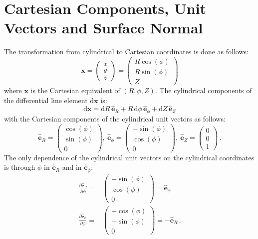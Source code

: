 \section{Cartesian Components, Unit Vectors and Surface Normal}
The transformation from cylindrical to Cartesian coordinates is done as follows:
\begin{equation}
  \mathbf{x}
  = \left( \begin{array}{c} x \\ y \\ z \end{array} \right)
  = \left( \begin{array}{c}
                        R \cos(\phi) \\
                        R \sin(\phi) \\
                        Z
                      \end{array} \right) \label{eqn:cyl2cart}
\end{equation}
where $\mathbf{x}$ is the Cartesian equivalent of $(R, \phi, Z)$.
The cylindrical components of the differential line element $\mathrm{d}\mathbf{x}$ is:
\begin{equation}
  \mathrm{d}\mathbf{x} = \mathrm{d}R \, \hat{\mathbf{e}}_R + R \, \mathrm{d}\phi \, \hat{\mathbf{e}}_\phi + \mathrm{d}Z \, \hat{\mathbf{e}}_Z \label{eqn:dx_cyl}
\end{equation}
with the Cartesian components of the cylindrical unit vectors as follows:
\begin{equation}
  \hat{\mathbf{e}}_R    = \left( \begin{array}{c}  \cos(\phi) \\ \sin(\phi) \\ 0 \end{array} \right), ~
  \hat{\mathbf{e}}_\phi = \left( \begin{array}{c} -\sin(\phi) \\ \cos(\phi) \\ 0 \end{array} \right), ~
  \hat{\mathbf{e}}_Z    = \left( \begin{array}{c}      0      \\     0      \\ 1 \end{array} \right) \, .
\end{equation}
The only dependence of the cylindrical unit vectors on the cylindrical coordinates
is through $\phi$ in $\hat{\mathbf{e}}_R$ and in $\hat{\mathbf{e}}_\phi$:
\begin{align}
  \frac{\partial \hat{\mathbf{e}}_R   }{\partial \phi} =& \left( \begin{array}{c} -\sin(\phi) \\  \cos(\phi) \\ 0 \end{array} \right) =  \hat{\mathbf{e}}_\phi \\
  \frac{\partial \hat{\mathbf{e}}_\phi}{\partial \phi} =& \left( \begin{array}{c} -\cos(\phi) \\ -\sin(\phi) \\ 0 \end{array} \right) = -\hat{\mathbf{e}}_R \, .
\end{align}
